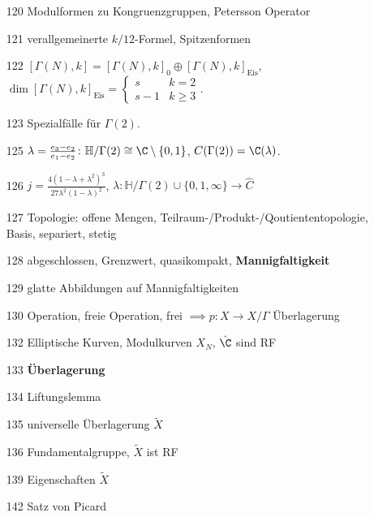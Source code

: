 \documentclass{article}
\begin{document}
\begin{itemize}
    \item[120] Modulformen zu Kongruenzgruppen, Petersson Operator
    \item[121] verallgemeinerte $k/12$-Formel, Spitzenformen
    \item[122] $[\Gamma(N), k] = [\Gamma(N), k]_0 \oplus [\Gamma(N), k]_{\mathrm{Eis}}$, $\operatorname{\dim}[\Gamma(N), k]_{\mathrm{Eis}} = \begin{cases}s & k = 2 \\s-1 &k \geq 3\end{cases}$.
    \item[123] Spezialfälle für $\Gamma(2)$.
    \item[125] $\lambda = \frac{e_3 - e_2}{e_1 - e_2}\colon \mathbb{H}/\Gamma(2) \cong \C\setminus\{0,1\}$, $C(\Gamma(2)) = \C(\lambda)$.
    \item[126] $j = \frac{4(1-\lambda + \lambda^2)^3}{27\lambda^2(1-\lambda)^2}$, $\lambda\colon \mathbb{H}/\Gamma(2) \cup \{0,1,\infty\} \to \hat C$  
\end{itemize}
\newpage
\begin{itemize}
    \item[127] Topologie: offene Mengen, Teilraum-/Produkt-/Qoutiententopologie, Basis, separiert, stetig
    \item[128] abgeschlossen, Grenzwert, quasikompakt, \textbf{Mannigfaltigkeit}
    \item[129] glatte Abbildungen auf Mannigfaltigkeiten
    \item[130] Operation, freie Operation, frei $ \implies p \colon X \to X/\Gamma$ Überlagerung
    \item[132] Elliptische Kurven, Modulkurven $X_N$, $\hat \C$ sind RF
    \item[133] \textbf{Überlagerung}
    \item[134] Liftungslemma
    \item[135] universelle Überlagerung $\tilde X$
    \item[136] Fundamentalgruppe, $\tilde X$ ist RF
    \item[139] Eigenschaften $\tilde X$ 
    \item[142] Satz von Picard 
\end{itemize}
\end{document}
